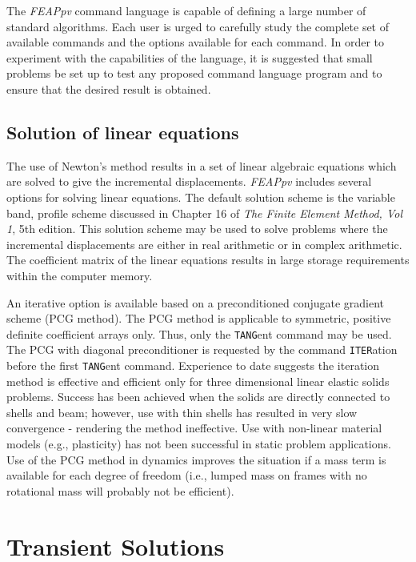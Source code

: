The {\sl FEAPpv} command language is
capable of defining a large number of standard algorithms.  Each user is urged
to carefully study the complete set of available commands and the options
available for each command.
In order to experiment with the capabilities of the language, it is suggested
that small problems be set up to test any proposed command language program
and to ensure that the desired result is obtained.

\subsection{Solution of linear equations}
\label{eqsoln}

The use of Newton's method results in a set of linear algebraic equations
which are solved to give the incremental displacements.  {\sl FEAPpv} includes
several options for solving linear equations.  The default solution scheme
is the variable band, profile scheme discussed in
Chapter 16 of \textit{The Finite Element Method, Vol 1},
5th edition.
This solution scheme may be used to solve problems where the incremental
displacements are either in real arithmetic or in complex arithmetic.  The
coefficient matrix of the linear equations results in large storage requirements
within the computer memory.

An iterative option is available based on a preconditioned conjugate
gradient scheme (PCG method).  The PCG method is applicable to symmetric,
positive definite coefficient arrays only.  Thus, only the {\tt TANG}ent
command may be used.  The PCG with diagonal preconditioner is requested
by the command {\tt ITER}\-a\-tion before the first {\tt TANG}\-ent
command.  Experience to date suggests the iteration
method is effective and efficient only for three dimensional linear
elastic solids problems.  Success has been achieved when the solids
are directly connected to shells and beam; however, use with thin
shells has resulted in very slow convergence - rendering the method
ineffective.  Use with non-linear material models (e.g., plasticity)
has not been successful in static problem applications.  Use of the PCG
method in dynamics improves the situation if a mass term is available for
each degree of freedom (i.e., lumped mass on frames with no rotational
mass will probably not be efficient).

\section{Transient Solutions}
\label{trans}

